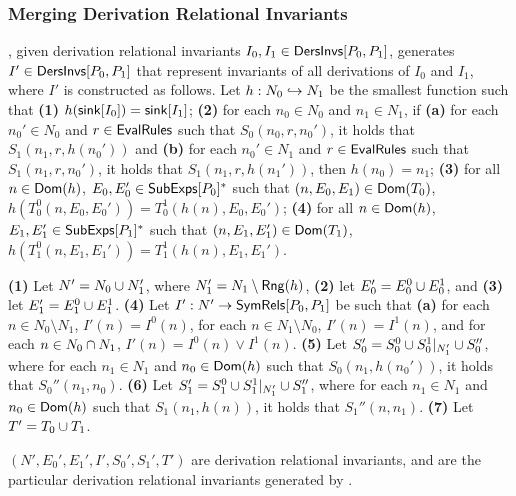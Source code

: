 \subsubsection{Merging Derivation Relational Invariants}
%
\mergeinvs, given derivation relational invariants $I_0, I_1 \in
\mathsf{DersInvs}[ P_0, P_1 ]$, generates $I' \in \mathsf{DersInvs}[ P_0, P_1 ]$ that
represent invariants of all derivations of $I_0$ and $I_1$,
where $I'$ is constructed as follows.
Let $h : N_0 \hookrightarrow N_1$ be the smallest function such that %
\textbf{(1)} $h(\mathsf{sink}[ I_0 ]) = \mathsf{sink}[ I_1 ]$; %
\textbf{(2)} for each $n_0 \in N_0$ and $n_1 \in N_1$, if \textbf{(a)}
for each $n_0' \in N_0$ and $r \in \mathsf{EvalRules}$ such that $S_0(n_0, r,
n_0')$, it holds that $S_1(n_1, r, h(n_0'))$ and %
\textbf{(b)} for each $n_0' \in N_1$ and $r \in \mathsf{EvalRules}$ such that
$S_1(n_1, r, n_0')$, it holds that $S_1(n_1, r, h(n_1'))$, then
$h(n_0) = n_1$; 
\textbf{(3)} for all $n \in \mathsf{Dom}(h)$, $E_0, E_0' \in
\mathsf{SubExps}[ P_0 ]^{*}$ such that $(n, E_0, E_1) \in \mathsf{Dom}(T_0)$,
$h(T_0^0(n, E_0, E_0')) = T_0^1(h(n), E_0, E_0')$;
\textbf{(4)} for all $n \in \mathsf{Dom}(h)$, $E_1, E_1' \in
\mathsf{SubExps}[ P_1 ]^{*}$ such that $(n, E_1, E_1') \in \mathsf{Dom}(T_1)$,
$h(T_1^0(n, E_1, E_1')) = T_1^1(h(n), E_1, E_1')$.

\textbf{(1)} Let $N' = N_0 \cup N_1'$, where $N_1' = N_1 \setminus
\mathsf{Rng}(h)$,
\textbf{(2)} let $E_0' = E_0^0 \cup E_0^1$, and
\textbf{(3)} let $E_1' = E_1^0 \cup E_1^1$.
\textbf{(4)} Let $I' : N' \to \mathsf{SymRels}[ P_0, P_1 ]$ be such that %
\textbf{(a)} for each $n \in N_0 \setminus N_1$, $I'(n) = I^0(n)$, %
for each $n \in N_1 \setminus N_0$, $I'(n) = I^1(n)$, and %
for each $n \in N_0 \cap N_1$, $I'(n) = I^0(n) \lor
I^1(n)$.
\textbf{(5)} Let $S_0' = S_0^0 \cup S_0^1|_{N_1'} \cup
S_0''$, where for each $n_1 \in N_1$ and $n_0 \in \mathsf{Dom}(h)$ such
that $S_0(n_1, h(n_0'))$, it holds that $S_0''(n_1, n_0)$.
\textbf{(6)} Let $S_1' = S_1^0 \cup S_1^1|_{N_1'} \cup
S_1''$, where for each $n_1 \in N_1$ and $n_0 \in \mathsf{Dom}(h)$ such
that $S_1(n_1, h(n))$, it holds that $S_1''(n, n_1)$.
\textbf{(7)} Let $T' = T_0 \cup T_1$.

$(N', E_0', E_1', I', S_0', S_1', T')$ are derivation relational
invariants, and are the particular derivation relational invariants
generated by \mergeinvs.

